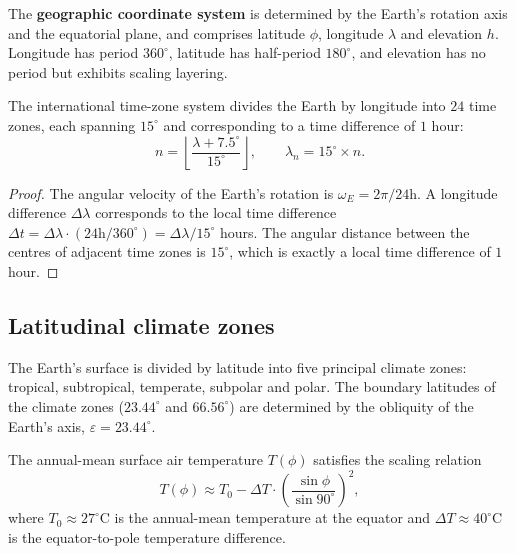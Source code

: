 \begin{definition}\label{def:geographic_coordinate}
The \textbf{geographic coordinate system} is determined by the Earth's rotation axis and the equatorial plane, and comprises latitude $\phi$, longitude $\lambda$ and elevation $h$. Longitude has period $360^\circ$, latitude has half-period $180^\circ$, and elevation has no period but exhibits scaling layering.
\end{definition}

\begin{proposition}\label{prop:timezone_periodicity}
The international time-zone system divides the Earth by longitude into $24$ time zones, each spanning $15^\circ$ and corresponding to a time difference of $1$ hour:
\[
n=\left\lfloor\frac{\lambda+7.5^\circ}{15^\circ}\right\rfloor,\qquad \lambda_n=15^\circ\times n.
\]
\end{proposition}

\begin{proof}
The angular velocity of the Earth's rotation is $\omega_E=2\pi/24\text{h}$. A longitude difference $\Delta\lambda$ corresponds to the local time difference $\Delta t=\Delta\lambda\cdot(24\text{h}/360^\circ)=\Delta\lambda/15^\circ$ hours. The angular distance between the centres of adjacent time zones is $15^\circ$, which is exactly a local time difference of $1$ hour.
\end{proof}

\subsection{Latitudinal climate zones}

\begin{definition}\label{def:climate_zones}
The Earth's surface is divided by latitude into five principal climate zones: tropical, subtropical, temperate, subpolar and polar. The boundary latitudes of the climate zones ($23.44^\circ$ and $66.56^\circ$) are determined by the obliquity of the Earth's axis, $\varepsilon=23.44^\circ$.
\end{definition}

\begin{proposition}\label{prop:climate_temperature_scaling}
The annual-mean surface air temperature $T(\phi)$ satisfies the scaling relation
\[
T(\phi)\approx T_0-\Delta T\cdot\left(\frac{\sin\phi}{\sin 90^\circ}\right)^2,
\]
where $T_0\approx 27^\circ$C is the annual-mean temperature at the equator and $\Delta T\approx 40^\circ$C is the equator-to-pole temperature difference.
\end{proposition}

